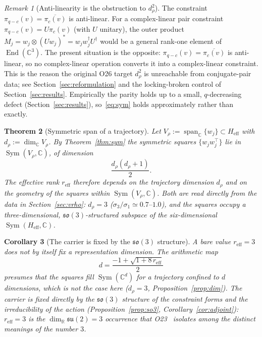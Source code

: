 \documentclass[12pt,a4paper]{article}
\newtheorem{theorem}{Theorem}[section]
\newtheorem{corollary}[theorem]{Corollary}
\theoremstyle{remark}
\newtheorem{remark}[theorem]{Remark}
\DeclareMathOperator{\Sym}{Sym}
\DeclareMathOperator{\End}{End}
\DeclareMathOperator{\Span}{span}
\newcommand{\su}{\mathfrak{su}}
\newcommand{\Heff}{H_{\mathrm{eff}}}
\newcommand{\Vrho}{V_{\rho}}
\newcommand{\reff}{r_{\mathrm{eff}}}
\begin{document}
    \begin{remark}[Anti-linearity is the obstruction to $d_\rho^2$]
      \label{rem:antilinear}
      The constraint $\pi_{q-c}(v) = \overline{\pi_c(v)}$ is anti-linear.
      For a complex-linear pair constraint $\pi_{q-c}(v) = U \pi_c(v)$ (with $U$ unitary), the outer product
      $M_j = w_j \otimes (U w_j)^{*} = w_j w_j^{\dagger} U^{\dagger}$ would be a general rank-one element of
      $\End(\mathbb{C}^3)$.
      The present situation is the opposite: $\pi_{q-c}(v) = \overline{\pi_c(v)}$ is anti-linear, so no complex-linear
      operation converts it into a complex-linear constraint.
      This is the reason the original O26 target $d_\rho^2$ is unreachable from conjugate-pair data; see
      Section~\ref{sec:reformulation} and the locking-broken control of Section~\ref{sec:results}.
      Empirically the parity holds up to a small, $q$-decreasing defect (Section~\ref{sec:results}), so~\eqref{eq:sym}
      holds approximately rather than exactly.
    \end{remark}

    \begin{theorem}[Symmetric span of a trajectory]
      \label{thm:rank}
      Let $\Vrho := \Span_{\mathbb{C}}\{w_j\} \subset \Heff$ with $d_{\rho} := \dim_{\mathbb{C}}\Vrho$.
      By Theorem~\ref{thm:sym} the symmetric squares $\{w_j w_j^{\top}\}$ lie in $\Sym(\Vrho, \mathbb{C})$, of
      dimension
      \begin{equation}
        \frac{d_{\rho}(d_{\rho}+1)}{2}.
        \label{eq:sym-rank}
      \end{equation}
      The effective rank $\reff$ therefore depends on the trajectory dimension $d_\rho$ and on the geometry of the
      squares within $\Sym(\Vrho, \mathbb{C})$.
      Both are read directly from the data in Section~\ref{sec:vrho}: $d_\rho = 3$
      ($\sigma_3/\sigma_1 \simeq 0.7\text{--}1.0$), and the squares occupy a three-dimensional,
      $\mathfrak{so}(3)$-structured subspace of the six-dimensional $\Sym(\Heff, \mathbb{C})$.
    \end{theorem}

    \begin{corollary}[The carrier is fixed by the $\mathfrak{so}(3)$ structure]
      \label{cor:drho}
      A bare value $\reff = 3$ does not by itself fix a representation dimension.
      The arithmetic map
      \begin{equation}
        d = \frac{-1 + \sqrt{1 + 8\,\reff}}{2}
        \label{eq:inversion}
      \end{equation}
      presumes that the squares fill $\Sym(\mathbb{C}^d)$ for a trajectory confined to $d$ dimensions, which is not
      the case here ($d_\rho = 3$, Proposition~\ref{prop:dim}).
      The carrier is fixed directly by the $\mathfrak{so}(3)$ structure of the constraint forms and the irreducibility
      of the action (Proposition~\ref{prop:so3}, Corollary~\ref{cor:adjoint}): $\reff = 3$ is the
      $\dim_{\mathbb{R}}\su(2) = 3$ occurrence that O23~\cite{Beau2026a27} isolates among the distinct meanings of the
      number $3$.
    \end{corollary}
\end{document}
